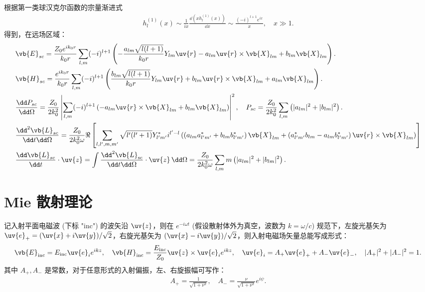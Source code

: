 根据第一类球汉克尔函数的宗量渐进式
\begin{align*}
	h_l^{(1)}(x)\sim\frac{1}{ix}\frac{\dd(xh_l^{(1)}(x))}{\dd x}\sim\frac{(-i)^{l+1}e^{ix}}{x},\quad x\gg1.
\end{align*}
得到，在远场区域：
\begin{align*}
	&\vb{E}_{sc} = \frac{Z_0e^{ik_0r}}{k_0r}\sum_{l,m}(-i)^{l+1}\left( -\frac{a_{lm}\sqrt{l(l+1)}}{k_0r}Y_{lm}\uv{r} - a_{lm}\uv{r}\times\vb{X}_{lm} + b_{lm}\vb{X}_{lm} \right).\\
	&\vb{H}_{sc} = \frac{e^{ik_0r}}{k_0r}\sum_{l,m}(-i)^{l+1}\left( \frac{b_{lm}\sqrt{l(l+1)}}{k_0r}Y_{lm}\uv{r} + b_{lm}\uv{r}\times\vb{X}_{lm} + a_{lm}\vb{X}_{lm} \right).\\
	&\frac{\dd P_{sc}}{\dd \Omega} = \frac{Z_0}{2k_0^2}\left| \sum_{l,m}(-i)^{l+1}\left( -a_{lm}\uv{r}\times\vb{X}_{lm} + b_{lm}\vb{X}_{lm} \right) \right|^2,\quad P_{sc} = \frac{Z_0}{2k_0^2}\sum_{l,m}\left( |a_{lm}|^2 + |b_{lm}|^2 \right).\\
	&\frac{\dd^2\vb{L}_{sc}}{\dd t\dd \Omega} = \frac{Z_0}{2k_0^2\omega}\Re\left[ \sum_{l,l',m,m'}\sqrt{l'(l'+1)}Y_{l'm'}^*i^{l'-l}\left( \left( a_{lm}a_{l'm'}^* + b_{lm}b_{l'm'}^* \right)\vb{X}_{lm} + \left( a_{l'm'}^*b_{lm} - a_{lm}b_{l'm'}^* \right)\uv{r}\times\vb{X}_{lm} \right) \right]\\
	&\frac{\dd  \vb{L}_{sc}}{\dd t}\cdot\uv{z}= \int\frac{\dd^2\vb{L}_{\mathrm{sc}}}{\dd t\dd \Omega}\cdot\uv{z}\,\dd \Omega = \frac{Z_0}{2k_0^2\omega}\sum_{l,m}m\left(|a_{lm}|^2 + |b_{lm}|^2\right).
\end{align*}

\section{Mie 散射理论}
记入射平面电磁波 (下标 "inc") 的波矢沿 \(\uv{z}\)，则在 \(e^{-i\omega t}\) (假设散射体外为真空，波数为 \(k = \omega/c\)) 规范下，左旋光基矢为
\(\uv{e}_+ = (\uv{x} + i\uv{y})/\sqrt{2}\)，右旋光基矢为
\((\uv{x} - i\uv{y})/\sqrt{2}\)，则入射电磁场矢量总能写成形式：
\begin{align*}
	\vb{E}_{\text{inc}} = E_{\text{inc}}\uv{e}_i e^{ikz}, \quad
	\vb{H}_{\text{inc}} = \frac{E_{\text{inc}}}{Z_0}\uv{z}\times\uv{e}_i e^{ikz}, \quad
	\uv{e}_i = A_+\uv{e}_+ + A_-\uv{e}_-, \quad |A_+|^2 + |A_-|^2 = 1.
\end{align*}
其中 \(A_+,A_-\) 是常数，对于任意形式的入射偏振，左、右旋振幅可写作：
\begin{align*}
	A_+ = \frac{1}{\sqrt{1 + \nu^2}},\quad A_- = \frac{\nu}{\sqrt{1 + \nu^2}}e^{i\psi}.
\end{align*}

